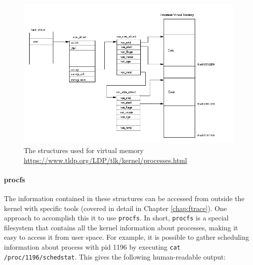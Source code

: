 \begin{figure}[ht]
\includegraphics[width=\textwidth]{images/mm.jpg}
\caption{The structures used for virtual memory \url{https://www.tldp.org/LDP/tlk/kernel/processes.html}}
\label{img:mm}
\end{figure}

\paragraph{procfs}
The information contained in these structures can be accessed from outside the kernel with specific tools (covered in detail in Chapter \ref{chap:ftrace}). One approach to accomplish this it to use \verb|procfs|. In short, \verb|procfs| is a special filesystem that contains all the kernel information about processes, making it easy to access it from user space. For example, it is possible to gather scheduling information about process with pid 1196 by executing \verb|cat /proc/1196/schedstat|. This gives the following human-readable output:


